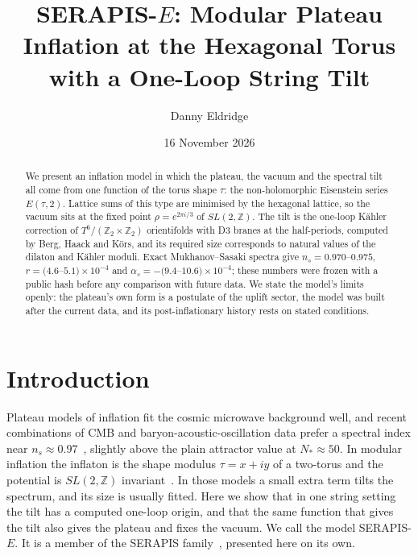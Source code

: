 \documentclass[aps,prd,twocolumn,superscriptaddress,nofootinbib,showkeys]{revtex4-2}
\begin{document}
\title{SERAPIS-$E$: Modular Plateau Inflation at the Hexagonal Torus with a One-Loop String Tilt}
\author{Danny Eldridge}
\date{16 November 2026}
\begin{abstract}
We present an inflation model in which the plateau, the vacuum and the spectral tilt all come from one function of the torus shape $\tau$: the non-holomorphic Eisenstein series $E(\tau,2)$. Lattice sums of this type are minimised by the hexagonal lattice, so the vacuum sits at the fixed point $\rho=e^{2\pi i/3}$ of $SL(2,\mathbb{Z})$. The tilt is the one-loop K\"ahler correction of $T^6/(\mathbb{Z}_2\times\mathbb{Z}_2)$ orientifolds with D3 branes at the half-periods, computed by Berg, Haack and K\"ors, and its required size corresponds to natural values of the dilaton and K\"ahler moduli. Exact Mukhanov--Sasaki spectra give $n_s=0.970$--$0.975$, $r=(4.6$--$5.1)\times10^{-4}$ and $\alpha_s=-(9.4$--$10.6)\times10^{-4}$; these numbers were frozen with a public hash before any comparison with future data. We state the model's limits openly: the plateau's own form is a postulate of the uplift sector, the model was built after the current data, and its post-inflationary history rests on stated conditions.
\end{abstract}
\maketitle

\section{Introduction}
Plateau models of inflation fit the cosmic microwave background well, and recent combinations of CMB and baryon-acoustic-oscillation data prefer a spectral index near $n_s\approx0.97$~\cite{ACT,SPT,DESI}, slightly above the plain attractor value at $N_*\approx50$. In modular inflation the inflaton is the shape modulus $\tau=x+iy$ of a two-torus and the potential is $SL(2,\mathbb{Z})$ invariant~\cite{KLsl2z,SERAPIS}. In those models a small extra term tilts the spectrum, and its size is usually fitted. Here we show that in one string setting the tilt has a computed one-loop origin, and that the same function that gives the tilt also gives the plateau and fixes the vacuum. We call the model SERAPIS-$E$. It is a member of the SERAPIS family~\cite{SERAPIS}, presented here on its own.
\end{document}
